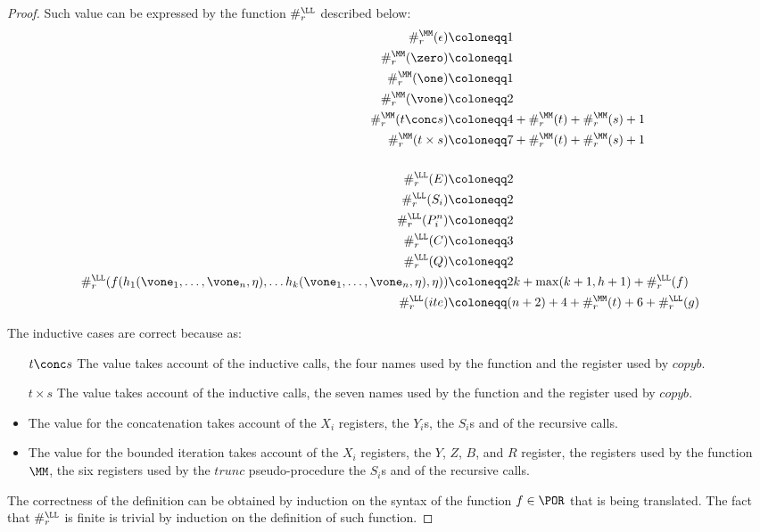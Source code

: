 \begin{proof}
Such value can be expressed by the function $\#_r^\LL$ described below:
\begin{align*}
\#_r^\MM(\epsilon)&\coloneqq 1\\
\#_r^\MM(\zero)&\coloneqq 1\\
\#_r^\MM(\one)&\coloneqq 1\\
\#_r^\MM(\vone)&\coloneqq 2\\
\#_r^\MM(t \conc s)&\coloneqq 4+\#_r^\MM(t)+\#_r^\MM(s)+1\\
\#_r^\MM(t \times s)&\coloneqq 7+\#_r^\MM(t)+\#_r^\MM(s)+1\\\\
\#_r^\LL(E)&\coloneqq 2\\
\#_r^\LL(S_i)&\coloneqq 2\\
\#_r^\LL({P}_i^n)&\coloneqq 2\\
\#_r^\LL(C)&\coloneqq 3\\
\#_r^\LL(Q)&\coloneqq 2\\
\#_r^\LL(f(h_1(\vone_1,\ldots, \vone_n, \eta), \ldots h_k(\vone_1,\ldots, \vone_n, \eta), \eta))&\coloneqq 2k+\max(k+1, h+1)+\#_r^\LL(f)\\
\#_r^\LL(ite)&\coloneqq (n+2)+4+ \#_r^\MM(t)+6+\#_r^\LL(g)\\
\end{align*}

The inductive cases are correct because as:

\begin{itemize}
\item[$t\conc s$] The value takes account of the inductive calls, the four names used by the function and the register used by $copyb$.
\item[$t\times s$] The value takes account of the inductive calls, the seven names used by the function and the register used by $copyb$.
\item The value for the concatenation takes account of the $X_i$ registers, the $Y_i$s, the $S_i$s and of the recursive calls.
\item The value for the bounded iteration takes account of the $X_i$ registers, the $Y$, $Z$, $B$, and $R$ register, the registers used by the function $\MM$, the six registers used by the $trunc$ pseudo-procedure the $S_i$s and of the recursive calls.
\end{itemize}

The correctness of the definition can be obtained by induction on the syntax of the function $f\in\POR$ that is being translated. The fact that $\#_r^\LL$ is finite is trivial by induction on the definition of such function.
\end{proof}

